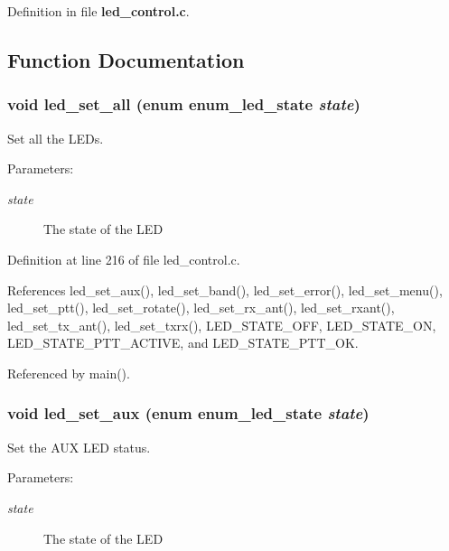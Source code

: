 Definition in file {\bf led\_\-control.c}.

\subsection{Function Documentation}
\subsubsection[{led\_\-set\_\-all}]{\setlength{\rightskip}{0pt plus 5cm}void led\_\-set\_\-all (enum {\bf enum\_\-led\_\-state} {\em state})}\label{led__control_8c_d25bd9b40562f08dec9dd7a267f42583}


Set all the LEDs. 

\begin{Desc}
\item[Parameters:]
\begin{description}
\item[{\em state}]The state of the LED \end{description}
\end{Desc}


Definition at line 216 of file led\_\-control.c.

References led\_\-set\_\-aux(), led\_\-set\_\-band(), led\_\-set\_\-error(), led\_\-set\_\-menu(), led\_\-set\_\-ptt(), led\_\-set\_\-rotate(), led\_\-set\_\-rx\_\-ant(), led\_\-set\_\-rxant(), led\_\-set\_\-tx\_\-ant(), led\_\-set\_\-txrx(), LED\_\-STATE\_\-OFF, LED\_\-STATE\_\-ON, LED\_\-STATE\_\-PTT\_\-ACTIVE, and LED\_\-STATE\_\-PTT\_\-OK.

Referenced by main().
\subsubsection[{led\_\-set\_\-aux}]{\setlength{\rightskip}{0pt plus 5cm}void led\_\-set\_\-aux (enum {\bf enum\_\-led\_\-state} {\em state})}\label{led__control_8c_c6073b4001daa7a7ea4f7220dcbe62a4}


Set the AUX LED status. 

\begin{Desc}
\item[Parameters:]
\begin{description}
\item[{\em state}]The state of the LED \end{description}
\end{Desc}


